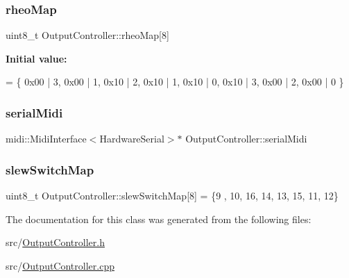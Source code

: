 \subsubsection{\texorpdfstring{rheo\+Map}{rheoMap}}
{\footnotesize\ttfamily uint8\+\_\+t Output\+Controller\+::rheo\+Map\mbox{[}8\mbox{]}\hspace{0.3cm}{\ttfamily [private]}}

{\bfseries Initial value\+:}
\begin{DoxyCode}
= \{
    0x00 | 3, 
    0x00 | 1, 
    0x10 | 2, 
    0x10 | 1, 
    0x10 | 0, 
    0x10 | 3, 
    0x00 | 2, 
    0x00 | 0  
  \}
\end{DoxyCode}
\mbox{\label{class_output_controller_a567ff7ec4d3681767234a68440e8f244}} 
\subsubsection{\texorpdfstring{serial\+Midi}{serialMidi}}
{\footnotesize\ttfamily midi\+::\+Midi\+Interface$<$Hardware\+Serial$>$$\ast$ Output\+Controller\+::serial\+Midi\hspace{0.3cm}{\ttfamily [private]}}

\mbox{\label{class_output_controller_a51c8fb4ab13bbc249e0daef8284ceb1c}} 
\subsubsection{\texorpdfstring{slew\+Switch\+Map}{slewSwitchMap}}
{\footnotesize\ttfamily uint8\+\_\+t Output\+Controller\+::slew\+Switch\+Map\mbox{[}8\mbox{]} = \{9 , 10, 16, 14, 13, 15, 11, 12\}\hspace{0.3cm}{\ttfamily [private]}}



The documentation for this class was generated from the following files\+:\begin{DoxyCompactItemize}
\item 
src/\hyperlink{_output_controller_8h}{Output\+Controller.\+h}\item 
src/\hyperlink{_output_controller_8cpp}{Output\+Controller.\+cpp}\end{DoxyCompactItemize}
